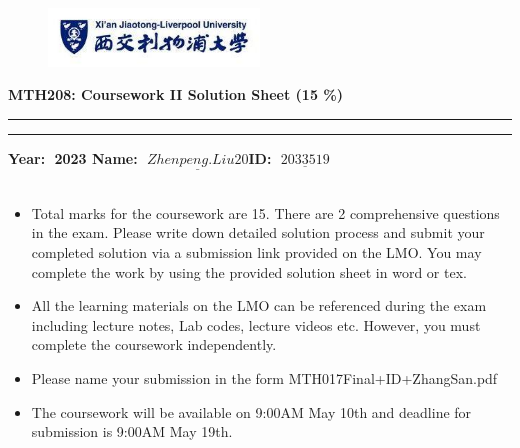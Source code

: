 \documentclass{article}
\begin{document}
\thispagestyle{empty}%
\sffamily
\begin{flushleft}
\begin{figure}
    \centering
		\includegraphics[width=0.50\textwidth]{XJTLU}
	\label{fig:XJTLU}
\end{figure}

{\Large {\textbf{MTH208: Coursework II Solution Sheet (15 \%)} \hfill }}\\%
\vspace*{0.2cm}  %
\hrule
\vskip0.02cm
\hrule  %
\vskip0.4cm  %
{\textbf{\large {Year:$\;$ 2023  \quad Name:$\;$ $\underline{Zhenpeng.Liu20}$\quad ID:$\;$ $\underline{2033519}$  }}\\
} \\[0.7cm]
\begin{itemize}
  \item Total marks for the coursework  are 15. There are 2 comprehensive questions in the exam. Please write down detailed solution process and submit your completed solution via a submission link provided on the LMO. You may complete the work by using the provided solution sheet in word or tex.
  \item  All the learning materials on the LMO can be
referenced during the exam including lecture notes, Lab codes,
lecture videos etc. However, you must complete the coursework independently.
 \item Please name your submission in the form {\text MTH017Final+ID+ZhangSan.pdf}
\item The coursework will be available on 9:00AM May 10th and deadline for submission is 9:00AM  May 19th.
\end{itemize}


\end{flushleft}
\end{document}
